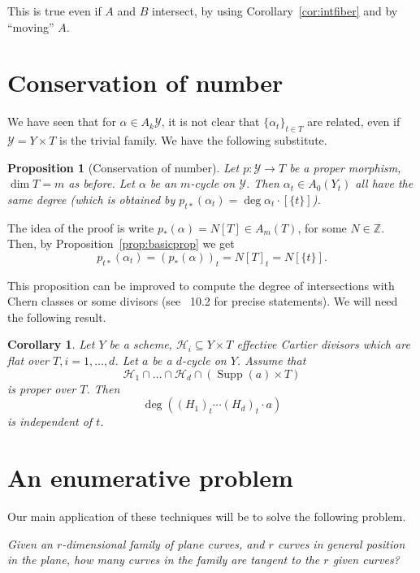 \documentclass[leqno, openany]{memoir}
\newtheorem{cor}[thm]{Corollary}
\newtheorem{prop}[thm]{Proposition}
\theoremstyle{definition}
\theoremstyle{remark}
\theoremstyle{plain}
\theoremstyle{definition}
\theoremstyle{remark}
\newcommand{\Z}{\mathbb{Z}}
\newcommand{\msc}[1]{\mathscr{#1}}
\DeclareMathOperator{\Supp}{Supp}
\begin{document}
This is true even if $A$ and $B$ intersect, by using Corollary~\ref{cor:intfiber} and by ``moving'' $A$. 

\section{Conservation of number}

We have seen that for $\alpha \in A_k\msc{Y}$, it is not clear that ${\{\alpha_t\}}_{t \in T}$ are related, even if $\msc{Y}=Y \times T$ is the trivial family.  We have the following substitute.

\begin{prop}[Conservation of number]
Let $p\colon \msc{Y} \to T$ be a proper morphism, $\dim T=m$ as before. Let $\alpha$ be an $m$-cycle on $\msc{Y}$. Then $\alpha_t \in A_0(Y_t)$ all have the same degree (which is obtained by $p_{t\ast}(\alpha_t)=\deg \alpha_t\cdot [\{t\}]$). 
\end{prop}

The idea of the proof is write $p_\ast(\alpha)=N[T] \in A_m(T)$, for some $N \in \Z$. Then, by Proposition~\ref{prop:basicprop} we get
\[ p_{t\ast}(\alpha_t)={ (p_\ast(\alpha)) }_t = { N[T] }_t= N[\{t\}]. \]

This proposition can be improved to compute the degree of intersections with Chern classes or some divisors (see \textsection~10.2 for precise statements). We will need the following result.

\begin{cor}
Let $Y$ be a scheme, $\msc{H}_i \subseteq Y \times T$ effective Cartier divisors which are flat over $T, i=1, \dots, d$. Let $a$ be a $d$-cycle on $Y$. Assume that
\[ \msc{H}_1 \cap \dots \cap \msc{H}_d \cap (\Supp(a) \times T) \]
is proper over $T$. Then
\[ \deg({ (H_1) }_t \cdots { (H_d) }_t \cdot a) \]
is independent of $t$. 
\end{cor}

\section{An enumerative problem}

Our main application of these techniques will be to solve the following problem.
\begin{center}
\emph{Given an $r$-dimensional family of plane curves, and $r$ curves in general position in the plane, how many curves in the family are tangent to the $r$ given curves?}
\end{center}
\end{document}

